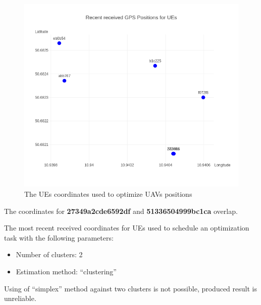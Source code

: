 \begin{figure}[H]
	\centering
	\includegraphics[width=\linewidth,keepaspectratio]{images/Exp4_UEs_Location_to_optimize.png}
\caption{The UEs coordinates used to optimize UAVs positions}
\end{figure}

The coordinates for \textbf{27349a2cde6592df} and
\textbf{51336504999bc1ca} overlap.

The most recent received coordinates for UEs used to schedule an
optimization task with the following parameters:

\begin{itemize}
\tightlist
\item
  Number of clusters: 2
\item
  Estimation method: ``clustering''
\end{itemize}

Using of ``simplex'' method against two clusters is not possible, produced result is unreliable.

